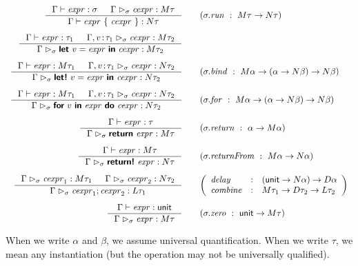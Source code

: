 \documentclass[runningheads,a4paper]{llncs}
\begin{document}
\begin{equation*}
\begin{array}{rl}
\inference 
  { \Gamma \vdash \expr : \sigma  & \Gamma \cvdash \cexpr : \mtyp{\tau} }
  { \Gamma \vdash \expr ~\{~ \cexpr ~\} : \ntyp \tau }
&\quad(\sigma.\plc{run}~:~\mtyp{\tau} \rightarrow \ntyp \tau )  
\\[1.5em]
\inference
  { \Gamma \vdash \expr : \tau_1 &
    \Gamma, \tya{v}{\tau_1} \cvdash \cexpr : \mtyp{\tau_2} }
  { \Gamma \cvdash \kvd{let}~v=\expr~\kvd{in}~\cexpr : \mtyp{\tau_2}  }
\\[1.5em]
\inference
  { \Gamma \vdash \expr : \mtyp{\tau_1} &
    \Gamma, \tya{v}{\tau_1} \cvdash \cexpr : \ntyp{\tau_2} }
  { \Gamma \cvdash \kvd{let!}~v=\expr~\kvd{in}~\cexpr : \ntyp{\tau_2}  }
&\quad(\sigma.\plc{bind}~:~\mtyp{\alpha} \rightarrow (\alpha \rightarrow \ntyp{\beta}) \rightarrow \ntyp{\beta} )  
\\[1.5em]
\inference
  { \Gamma \vdash \expr : \mtyp{\tau_1} &
    \Gamma, \tya{v}{\tau_1} \cvdash \cexpr : \ntyp{\tau_2} }
  { \Gamma \cvdash \kvd{for}~v~\kvd{in}~\expr~\kvd{do}~\cexpr : \ntyp{\tau_2}  }
&\quad(\sigma.\plc{for}~:~\mtyp{\alpha} \rightarrow (\alpha \rightarrow \ntyp{\beta}) \rightarrow \ntyp{\beta} )  
\\[1.5em]
\inference
  { \Gamma \vdash \expr : \tau }
  { \Gamma \cvdash \kvd{return}~\expr : \mtyp{\tau}  }
&\quad(\sigma.\plc{return}~:~\alpha \rightarrow \mtyp{\alpha})
\\[1.5em]
\inference
  { \Gamma \vdash \expr : \mtyp \tau }
  { \Gamma \cvdash \kvd{return!}~\expr : \ntyp{\tau}  }
&\quad(\sigma.\plc{returnFrom}~:~\mtyp{\alpha} \rightarrow \ntyp{\alpha})  
\\[1.5em]
\inference
  { \Gamma \cvdash \cexpr_1 : \mtyp{\tau_1}  &  \Gamma \cvdash \cexpr_2 : \ntyp{\tau_2}}
  { \Gamma \cvdash \cexpr_1; \cexpr_2 : \ltyp{\tau_1}  }
&\quad\left(\begin{array}{lll}
\plc{delay}   &:& (\unit \rightarrow \ntyp{\alpha}) \rightarrow \dtyp{\alpha} \\
\plc{combine} &:& \mtyp{\tau_1} \rightarrow \dtyp{\tau_2} \rightarrow \ltyp{\tau_2}
\end{array}\right)
\\[1.5em]
\inference
  { \Gamma \vdash \expr : \unit }
  { \Gamma \cvdash \expr : \mtyp{\tau}  }
&\quad(\sigma.\plc{zero}~:~\unit \rightarrow \mtyp{\tau})
\end{array}
\end{equation*}

When we write $\alpha$ and $\beta$, we assume universal quantification. When we write $\tau$, we 
mean any instantiation (but the operation may not be universally qualified).
\end{document}
